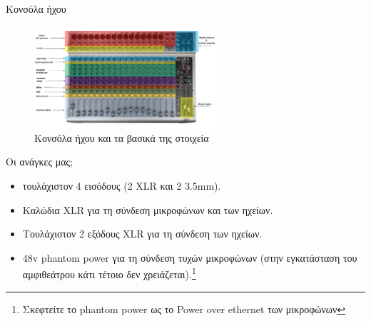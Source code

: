 \documentclass[aspectratio=169]{beamer}
\begin{document}
\begin{frame}[allowframebreaks]{Κονσόλα ήχου}
  \begin{figure}
    \centering
    \includegraphics[width=0.6\textwidth]{images/mixer.png}
    \caption{Κονσόλα ήχου και τα βασικά της στοιχεία}
  \end{figure}

  \begin{block}{Οι ανάγκες μας;}
    \begin{itemize}
      \item τουλάχιστον 4 εισόδους (2 XLR και 2 3.5mm).
      \item Καλώδια XLR για τη σύνδεση μικροφώνων και των ηχείων.
      \item Τουλάχιστον 2 εξόδους XLR για τη σύνδεση των ηχείων.
      \item 48v phantom power για τη σύνδεση τυχών μικροφώνων (στην εγκατάσταση
            του αμφιθεάτρου κάτι τέτοιο δεν χρειάζεται).\footnote{Σκεφτείτε το phantom power ως το Power over ethernet των μικροφώνων}
    \end{itemize}
  \end{block}
\end{frame}
\end{document}
